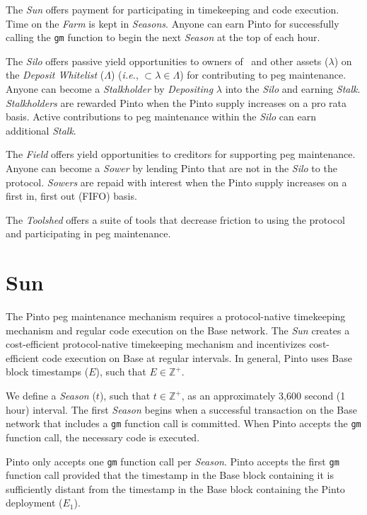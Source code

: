 \documentclass[tikz]{article}
\newcommand{\code}[1]{\texttt{#1}}
\newcommand{\term}[1]{\textsl{#1}}
\newcommand{\Pinto}{} %
\begin{document}
The \term{Sun} offers payment for participating in timekeeping and code execution. Time on the \term{Farm} is kept in \term{Seasons}. Anyone can earn Pinto for successfully calling the \code{gm} function to begin the next \term{Season} at the top of each hour.

The \term{Silo} offers passive yield opportunities to owners of \Pinto\ and other assets ($\lambda$) on the \term{Deposit Whitelist} ($\Lambda$) (\textit{i.e.}, $\Pinto \subset \lambda \in \Lambda$) for contributing to peg maintenance. Anyone can become a \term{Stalkholder} by \term{Depositing} $\lambda$ into the \term{Silo} and earning \term{Stalk}. \term{Stalkholders} are rewarded Pinto when the Pinto supply increases on a pro rata basis. Active contributions to peg maintenance within the \term{Silo} can earn additional \term{Stalk}.

The \term{Field} offers yield opportunities to creditors for supporting peg maintenance. Anyone can become a \term{Sower} by lending Pinto that are not in the \term{Silo} to the protocol. \term{Sowers} are repaid with interest when the Pinto supply increases on a first in, first out (FIFO) basis. 

The \term{Toolshed} offers a suite of tools that decrease friction to using the protocol and participating in peg maintenance.


\section{Sun}

The Pinto peg maintenance mechanism requires a protocol-native timekeeping mechanism and regular code execution on the Base network. The \term{Sun} creates a cost-efficient protocol-native timekeeping mechanism and incentivizes cost-efficient code execution on Base at regular intervals. In general, Pinto uses Base block timestamps ($E$), such that $E \in \mathbb{Z}^{+}$.

\newpage

We define a \term{Season} ($t$), such that $t \in \mathbb{Z}^{+}$, as an approximately 3,600 second (1 hour) interval. The first \term{Season} begins when a successful transaction on the Base network that includes a \code{gm} function call is committed. When Pinto accepts the \code{gm} function call, the necessary code is executed.

Pinto only accepts one \code{gm} function call per \term{Season}. Pinto accepts the first \code{gm} function call provided that the timestamp in the Base block containing it is sufficiently distant from the timestamp in the Base block containing the Pinto deployment ($E_{1}$).
\end{document}
